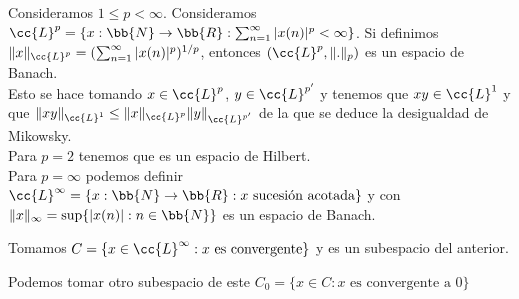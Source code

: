 \begin{ejemplo}
    Consideramos $1\leq p < \infty$. Consideramos $\cc{L}^p = \{ x : \bb{N} \to \bb{R} : \sum_{n=1}^{\infty}|x(n)|^p < \infty\}$. Si definimos $\|x\|_{\cc{L}^p} = (\sum_{n=1}^{\infty}|x(n)|^p)^{1/p}$, entonces $(\cc{L}^p, \|.\|_p)$ es un espacio de Banach.\\

    Esto se hace tomando $x\in \cc{L}^p$, $y\in \cc{L}^{p'}$ y tenemos que $xy\in \cc{L}^1$ y que $\|xy\|_{\cc{L}^1} \leq \|x\|_{\cc{L}^p} \|y\|_{\cc{L}^{p'}}$ de la que se deduce la desigualdad de Mikowsky.\\

    Para $p=2$ tenemos que es un espacio de Hilbert.\\

    Para $p=\infty$ podemos definir $\cc{L}^{\infty} = \{x : \bb{N} \to \bb{R} : x \text{ sucesión acotada}\}$ y con $\|x\|_\infty = \sup\{|x(n)| : n\in \bb{N}\}$ es un espacio de Banach.
\end{ejemplo}

\begin{ejemplo}
    Tomamos $C = \{x\in \cc{L}^{\infty} : x \text{ es convergente}\}$ y es un subespacio del anterior. 

    Podemos tomar otro subespacio de este $C_0 = \{x\in C : x \text{ es convergente a } 0\}$
\end{ejemplo}



